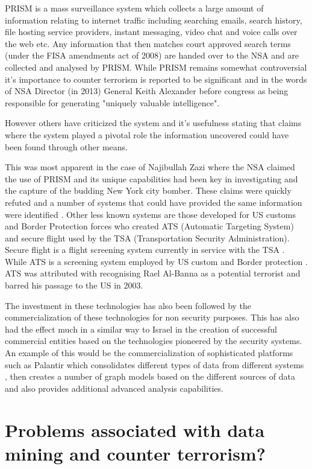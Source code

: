 PRISM is a mass surveillance system which collects a large amount of information relating to internet traffic including searching emails, search history, file hosting service providers, instant messaging, video chat and voice calls over the web etc. Any information that then matches court approved search terms (under the FISA amendments act of 2008) are handed over to the NSA and are collected and analysed by PRISM. While PRISM remains somewhat controversial it's importance to counter terrorism is reported to be significant and in the words of NSA Director (in 2013) General Keith Alexander before congress as being responsible for generating "uniquely valuable intelligence". 

However others have criticized the system and it's usefulness stating that claims where the system played a pivotal role the information uncovered could have been found through other means. 

This was most apparent in the case of Najibullah Zazi where the NSA claimed the use of PRISM and its unique capabilities had been key in investigating and the capture of the budding New York city bomber. These claims were quickly refuted and  a number of systems that could have provided the same information were identified \citep{NSAAtlanticWire2013}. Other less known systems are those developed for US customs and Border Protection forces who created ATS (Automatic Targeting System) and secure flight used by the TSA (Transportation Security Administration). Secure flight is a flight screening system currently in service with the TSA \citep{spear2015secure}. While ATS is a screening system employed by US custom and Border protection \citep{jizba2015analysis}. ATS was attributed with recognising Rael Al-Banna as a potential terrorist and barred his passage to the US in 2003.

The investment in these technologies has also been followed by the commercialization of these technologies for non security purposes. This has also had the effect much in a similar way to Israel in the creation of successful commercial entities based on the technologies pioneered by the security systems.  An example of this would be the commercialization of sophisticated platforms such as Palantir which consolidates different types of data from different systems \citep{soklakova2016technological}, then creates a number of graph models based on the different sources of data and also provides additional advanced analysis capabilities.

\section{Problems associated with data mining and counter terrorism?}


